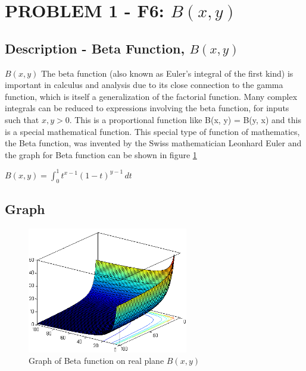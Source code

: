 \documentclass[letterpaper, 11pt]{article}
\begin{document}
\tableofcontents
\listoffigures
\newpage
\section{PROBLEM 1 - F6: $B(x,y)$}
    \subsection{Description -  Beta Function, $B(x,y)$ } 
         \normalsize{ \cite{mathworld} $B(x,y)$ The beta function (also known as Euler's integral of the first kind) is important in calculus and analysis due to its close connection to the gamma function, which is itself a generalization of the factorial function. Many complex integrals can be reduced to expressions involving the beta function, for inputs such that $x, y > 0$. This is a proportional function like B(x, y) = B(y, x) and this is a special mathematical function. This special type of function of mathematics, the Beta function, was invented by the Swiss mathematician Leonhard Euler and the graph for Beta function can be shown in figure \ref{fig:beta_graph} \cite{mathworld}\cite{byjus}\\
                            
        \begin{center}
            ${B}(x,y)=\int _{0}^{1}t^{x-1}(1-t)^{y-1}\,dt$ 
        \end{center}
         }
 
    \subsection{Graph}
        \begin{figure}[htb]
            \begin{center}
                  \includegraphics[width= 7cm]{images/BetaFunction.png}
            \end{center}
             \caption{ Graph of Beta function on real plane $B(x,y)$}
            \label{fig:beta_graph}
        \end{figure}
\end{document}
